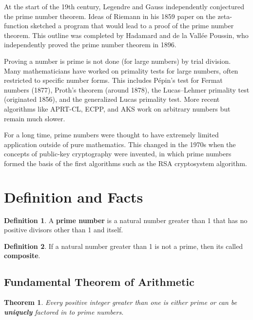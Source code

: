 \documentclass[a4paper,draft]{amsproc}
\theoremstyle{plain}
\newtheorem{thm}{Theorem}[section]
\theoremstyle{definition}
\newtheorem{dfn}{Definition}[section]
\theoremstyle{remark}
\numberwithin{equation}{section}
\begin{document}
At the start of the 19th century, Legendre and Gauss independently conjectured the prime number theorem. Ideas of Riemann in his  1859 paper on the zeta-function sketched a program that would lead to a proof of the prime number theorem. This outline was completed by  Hadamard  and  de la Vallée Poussin, who independently proved the  prime number theorem  in 1896.

Proving a number is prime is not done (for large numbers) by trial division. Many mathematicians have worked on
primality tests for large numbers, often restricted to specific number forms. This includes  Pépin's test  for Fermat
numbers (1877),  Proth's theorem  (around 1878), the  Lucas–Lehmer primality test  (originated 1856), and the
generalized Lucas primality test. More recent algorithms like APRT-CL, ECPP, and AKS work on arbitrary numbers
but remain much slower.

For a long time, prime numbers were thought to have extremely limited application outside of pure mathematics. This changed in the 1970s when the concepts of  public-key cryptography  were invented, in which prime numbers formed the basis of the first algorithms such as the RSA cryptosystem algorithm.

\section{Definition and Facts}

\begin{dfn}
A \textbf{prime number} is a natural number greater than 1 that has no positive divisors other than 1 and itself.
\end{dfn}

\begin{dfn}
If a natural number greater than 1 is not a prime, then its called \textbf{composite}.
\end{dfn}
\subsection{Fundamental Theorem of Arithmetic}
\begin{thm}\label{fundamental}
Every positive integer greater than one is either prime or can be \textbf{uniquely} factored in to \textit{prime} numbers.
\end{thm}
\end{document}
